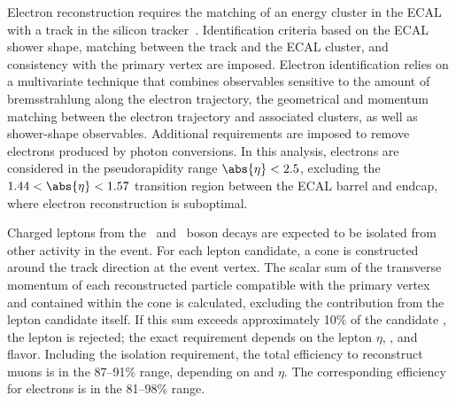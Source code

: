 \documentclass[11pt,twoside,a4paper,cmspaper,final,collab]{cms-tdr}
\begin{document}
Electron reconstruction requires the matching
of an energy cluster in the ECAL with a track in the silicon
tracker~\cite{CMS-PAS-EGM-10-004}. Identification criteria based on the ECAL
shower shape, matching between the track and the ECAL cluster, and consistency with the
primary vertex are imposed. Electron identification relies on a
multivariate technique that combines observables sensitive to the
amount of bremsstrahlung along the electron trajectory, the
geometrical and momentum matching between the electron trajectory and
associated clusters, as well as shower-shape observables. Additional requirements are imposed to remove electrons
produced by photon conversions. In this analysis, electrons are
considered in the pseudorapidity range $\abs{\eta} < 2.5$,
excluding the  $1.44 < \abs{\eta}< 1.57$ transition
region between the ECAL barrel and endcap, where electron
reconstruction is suboptimal.


Charged leptons from the \PW\ and \cPZ\  boson decays are expected to be isolated
from other activity in the event. For each lepton candidate, a cone
is constructed around the track direction at the event vertex.  The scalar
sum of the transverse momentum of each reconstructed
particle compatible with the primary vertex and contained within the cone is calculated,
excluding the contribution from the lepton candidate itself. If this
sum exceeds approximately 10\% of the candidate \pt, the lepton is
rejected; the exact requirement depends on the lepton $\eta$, \pt,
and flavor. Including the isolation requirement, the total efficiency to reconstruct
muons is in the 87--91\% range, depending on \pt and $\eta$. The
corresponding efficiency for electrons is in the 81--98\% range.
\end{document}
